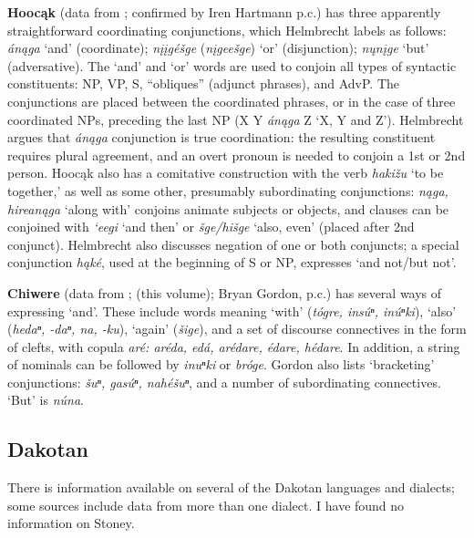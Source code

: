 \documentclass[output=paper]{LSP/langsci}
\begin{document}
\textbf{Hooc\k{a}k} (data from \citealt{Helmbrecht2004}; confirmed by Iren Hartmann p.c.) has three apparently straightforward coordinating conjunctions, which Helmbrecht labels as follows: \textit{án\k{a}ga} `and' (coordinate); \textit{n\k{i}\k{i}gé\v{s}ge} (\textit{n\k{i}gee\v{s}ge}) `or' (disjunction); \textit{n\k{u}n\k{i}ge} `but' (adversative). The `and' and `or' words are used to conjoin all types of syntactic constituents: NP, VP, S, ``obliques'' (adjunct phrases), and AdvP. The conjunctions are placed between the coordinated phrases, or in the case of three coordinated NPs, preceding the last NP (X Y \textit{án\k{a}ga} Z `X, Y and Z'). Helmbrecht argues that \textit{án\k{a}ga} conjunction is true coordination: the resulting constituent requires plural agreement, and an overt pronoun is needed to conjoin a 1st or 2nd person. Hooc\k{a}k also has a comitative construction with the verb \textit{haki\v{z}u} `to be together,' as well as some other, presumably subordinating conjunctions: \textit{n\k{a}ga, hirean\k{a}ga} `along with' conjoins animate subjects or objects, and clauses can be conjoined with \textit{`eegi} `and then' or \textit{\v{s}ge/hi\v{s}ge} `also, even' (placed after 2nd conjunct). Helmbrecht also discusses negation of one or both conjuncts; a special conjunction \textit{h\k{a}ké}, used at the beginning of S or NP, expresses `and not/but not'.

\textbf{Chiwere} (data from \citealt{Goodtracks1992}; \citealt{Greer2016} (this volume); Bryan Gordon, p.c.) has several ways of expressing `and'. These include words meaning `with' (\textit{tógre, insúⁿ, inúⁿki}), `also' (\textit{hedaⁿ, -daⁿ, na, -ku}), `again' (\textit{\v{s}ige}), and a set of discourse connectives in the form of clefts, with copula \textit{aré: aréda, edá, arédare, édare, hédare}. In addition, a string of nominals can be followed by \textit{inuⁿki} or \textit{bróge}. Gordon also lists `bracketing' conjunctions: \textit{\v{s}uⁿ, gasúⁿ, nahé\v{s}uⁿ}, and a number of subordinating connectives. `But' is \textit{núna}.

\subsection{Dakotan}
 
There is information available on several of the Dakotan languages and dialects; some sources include data from more than one dialect. I have found no information on Stoney.
\end{document}
